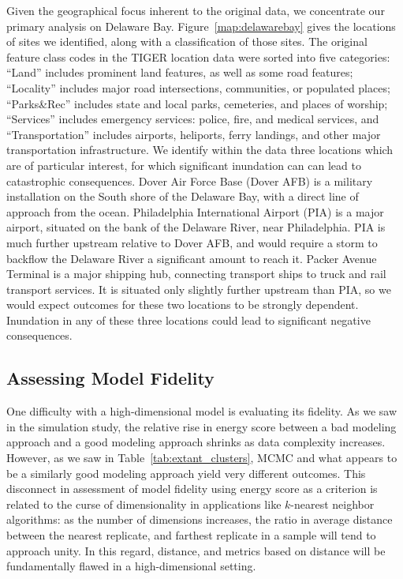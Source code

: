 Given the geographical focus inherent to the original data, we concentrate our primary
    analysis on Delaware Bay.  Figure~\ref{map:delawarebay} gives the locations of sites
    we identified, along with a classification of those sites.  The original feature class
    codes in the TIGER location data were sorted into five categories:  ``Land'' includes
    prominent land features, as well as some road features; ``Locality'' includes major road
    intersections, communities, or populated places; ``Parks\&Rec'' includes state and local
    parks, cemeteries, and places of worship; ``Services'' includes emergency services: police,
    fire, and medical services, and ``Transportation'' includes airports, heliports, ferry
    landings, and other major transportation infrastructure.  We identify within the data
    three locations which are of particular interest, for which significant inundation can
    can lead to catastrophic consequences.  Dover Air Force Base (Dover AFB) is a military
    installation on the South shore of the Delaware Bay, with a direct line of approach from 
    the ocean.  Philadelphia International Airport  (PIA) is a major airport, situated on the 
    bank of the Delaware River, near Philadelphia.   PIA is much further upstream relative to
    Dover AFB, and would require a storm to backflow the Delaware River a significant amount
    to reach it.  Packer Avenue Terminal is a major shipping hub, connecting transport ships to
    truck and rail transport services.  It is situated only slightly further upstream than PIA,
    so we would expect outcomes for these two locations to be strongly dependent.
    Inundation in any of these three locations could lead to significant negative consequences.

\subsection{Assessing Model Fidelity\label{subsec:sloshfidelity}}

One difficulty with a high-dimensional model is evaluating its fidelity.  As we saw in 
    the simulation study, the relative rise in energy score between a bad modeling approach 
    and a good modeling approach shrinks as data complexity increases.  However, as we 
    saw in Table~\ref{tab:extant_clusters}, MCMC and what appears to be a similarly good 
    modeling approach yield very different outcomes.  This disconnect in assessment of 
    model fidelity using energy score as a criterion is related to the curse of dimensionality 
    in applications like $k$-nearest neighbor algorithms: as the number of dimensions 
    increases, the ratio in average distance between the nearest replicate, and farthest 
    replicate in a sample will tend to approach unity.  In this regard, distance, and metrics 
    based on distance will be fundamentally flawed in a high-dimensional setting.

